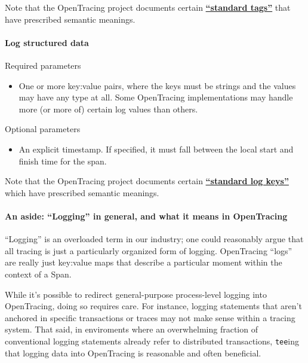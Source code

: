 \documentclass[a4paper,12pt,notitlepage,twoside,openright]{article}
\begin{document}
Note that the OpenTracing project documents certain
\textbf{\href{./semantic_conventions.md\#span-tags-table}{``standard
tags''}} that have prescribed semantic meanings.

\hypertarget{log-structured-data}{%
\paragraph{Log structured data}\label{log-structured-data}}

Required parameters

\begin{itemize}

\item
  One or more key:value pairs, where the keys must be strings and the
  values may have any type at all. Some OpenTracing implementations may
  handle more (or more of) certain log values than others.
\end{itemize}

Optional parameters

\begin{itemize}

\item
  An explicit timestamp. If specified, it must fall between the local
  start and finish time for the span.
\end{itemize}

Note that the OpenTracing project documents certain
\textbf{\href{./semantic_conventions.md\#log-fields-table}{``standard
log keys''}} which have prescribed semantic meanings.

\hypertarget{an-aside-logging-in-general-and-what-it-means-in-opentracing}{%
\paragraph{An aside: ``Logging'' in general, and what it means in
OpenTracing}\label{an-aside-logging-in-general-and-what-it-means-in-opentracing}}

``Logging'' is an overloaded term in our industry; one could reasonably
argue that all tracing is just a particularly organized form of logging.
OpenTracing ``logs'' are really just key:value maps that describe a
particular moment within the context of a Span.

While it's possible to redirect general-purpose process-level logging
into OpenTracing, doing so requires care. For instance, logging
statements that aren't anchored in specific transactions or traces may
not make sense within a tracing system. That said, in enviroments where
an overwhelming fraction of conventional logging statements already
refer to distributed transactions, \texttt{tee}ing that logging data
into OpenTracing is reasonable and often beneficial.
\end{document}
